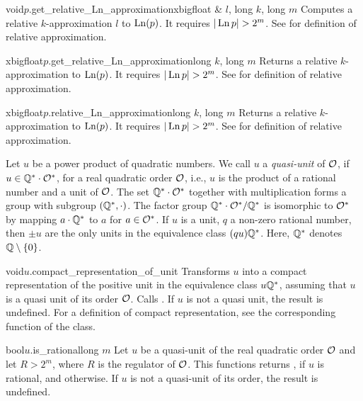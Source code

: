 \begin{cfcode}{void}{$p$.get_relative_Ln_approximation}{xbigfloat & $l$, long $k$, long $m$}
  Computes a relative $k$-approximation $l$ to $\operatorname{Ln}(p)$.  It requires $|\operatorname{Ln} p| > 2^m$.  See
   for definition of relative approximation.
\end{cfcode}

\begin{cfcode}{xbigfloat}{$p$.get_relative_Ln_approximation}{long $k$, long $m$}
  Returns a relative $k$-approximation to $\operatorname{Ln}(p)$.  It requires $|\operatorname{Ln} p| > 2^m$.  See
   for definition of relative approximation.
\end{cfcode}

\begin{cfcode}{xbigfloat}{$p$.relative_Ln_approximation}{long $k$, long $m$}
  Returns a relative $k$-approximation to $\operatorname{Ln}(p)$.  It requires $|\operatorname{Ln} p| > 2^m$.  See
   for definition of relative approximation.
\end{cfcode}



Let $u$ be a power product of quadratic numbers.  We call $u$ a \emph{quasi-unit} of $\mathcal{O}$, if
$u \in \mathbb{Q}^* \cdot \mathcal{O}^*$, for a real quadratic order $\mathcal{O}$, i.e., $u$ is the product of a
rational number and a unit of $\mathcal{O}$.  The set $\mathbb{Q}^* \cdot \mathcal{O}^*$ together with multiplication
forms a group with subgroup $(\mathbb{Q}^*,\cdot)$.  The factor group $\mathbb{Q}^* \cdot \mathcal{O}^* / \mathbb{Q}^*$
is isomorphic to $\mathcal{O}^*$ by mapping $a \cdot \mathbb{Q}^*$ to $a$ for $a\in \mathcal{O}^*$.  If $u$ is a
unit, $q$ a non-zero rational number, then $\pm u$ are the only units in the equivalence class
$(qu)\mathbb{Q}^*$.  Here, $\mathbb{Q}^*$ denotes $\mathbb{Q}\setminus\{0\}$.

\begin{fcode}{void}{$u$.compact_representation_of_unit}{}
  Transforms $u$ into a compact representation of the positive unit in the equivalence class $u
  \mathbb{Q}^*$, assuming that $u$ is a quasi unit of its order $\mathcal{O}$.  Calls
  .  If $u$ is not a quasi unit, the result is
  undefined.  For a definition of compact representation, see the corresponding 
  function of the class.
\end{fcode}

\begin{cfcode}{bool}{$u$.is_rational}{long $m$}
  Let $u$ be a quasi-unit of the real quadratic order $\mathcal{O}$ and let $R > 2^m$, where $R$ is the
  regulator of $\mathcal{O}$.  This functions returns \TRUE, if $u$ is rational, and \FALSE otherwise.  If
  $u$ is not a quasi-unit of its order, the result is undefined.
\end{cfcode}

